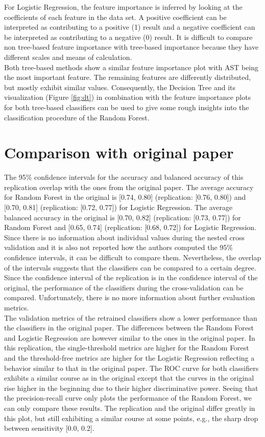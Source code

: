 For Logistic Regression, the feature importance is inferred by looking at the 
coefficients of each feature in the data set. A positive coefficient can be 
interpreted as contributing to a positive (1) result and a negative coefficient 
can be interpreted as contributing to a negative (0) result.
It is difficult to compare non tree-based feature importance with tree-based 
importance because they have different scales and means of calculation.
\\
Both tree-based methods show a similar feature importance plot with AST being 
the most important feature. The remaining features are differently distributed, 
but mostly exhibit similar values. Consequently, the Decision Tree and its 
visualization (Figure \ref{fig:dt}) in combination with the feature 
importance plots for both tree-based classifiers can be used to give some rough 
insights into the classification procedure of the Random Forest.

\section{Comparison with original paper}
The 95\% confidence intervals for the accuracy and balanced accuracy of this 
replication overlap with the ones from the original paper. The average accuracy 
for Random Forest in the original is [0.74, 0.80] (replication: [0.76, 0.80]) 
and [0.70, 0.81] (replication: [0.72, 0.77]) for Logistic Regression. The 
average balanced accuracy in the original is [0.70, 0.82] (replication: 
[0.73, 0.77]) for Random Forest and [0.65, 0.74] (replication: [0.68, 0.72]) 
for Logistic Regression. Since there is no information about individual values 
during the nested cross validation and it is also not reported how the authors 
computed the 95\% confidence intervals, it can be difficult to compare them. 
Nevertheless, the overlap of the intervals suggests that the classifiers can be 
compared to a certain degree. Since the confidence interval of the replication 
is in the confidence interval of the original, the performance of the 
classifiers during the cross-validation can be compared. Unfortunately, there 
is no more information about further evaluation metrics.
\\
The validation metrics of the retrained classifiers show a lower performance 
than the classifiers in the original paper. The differences between the Random 
Forest and Logistic Regression are however similar to the ones in the original 
paper. In this replication, the single-threshold metrics are higher for the 
Random Forest and the threshold-free metrics are higher for the Logistic 
Regression reflecting a behavior similar to that in the original paper. The 
ROC curve for both classifiers exhibits a similar course as in the original 
except that the curves in the original rise higher in the beginning due to 
their higher discriminative power. Seeing that the precision-recall curve only 
plots the performance of the Random Forest, we can only compare these results. 
The replication and the original differ greatly in this plot, but still 
exhibiting a similar course at some points, e.g., the sharp drop between 
sensitivity [0.0, 0.2]. 
